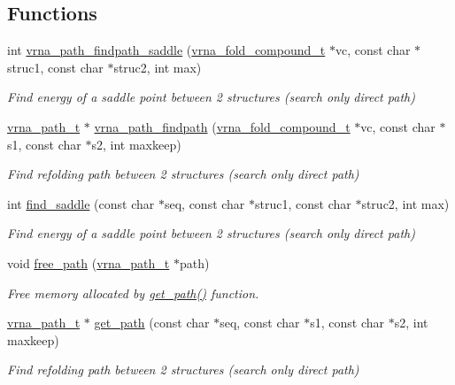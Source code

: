 \subsection*{Functions}
\begin{DoxyCompactItemize}
\item 
int \hyperlink{group__direct__paths_ga957922acc1bcaa97f52cbd0975f7dcd0}{vrna\-\_\-path\-\_\-findpath\-\_\-saddle} (\hyperlink{group__fold__compound_ga1b0cef17fd40466cef5968eaeeff6166}{vrna\-\_\-fold\-\_\-compound\-\_\-t} $\ast$vc, const char $\ast$struc1, const char $\ast$struc2, int max)
\begin{DoxyCompactList}\small\item\em Find energy of a saddle point between 2 structures (search only direct path) \end{DoxyCompactList}\item 
\hyperlink{group__direct__paths_ga818d4f3d1cf8723d6905990b08d909fe}{vrna\-\_\-path\-\_\-t} $\ast$ \hyperlink{group__direct__paths_ga5e1f97f58adc65016a8df88802dc16b5}{vrna\-\_\-path\-\_\-findpath} (\hyperlink{group__fold__compound_ga1b0cef17fd40466cef5968eaeeff6166}{vrna\-\_\-fold\-\_\-compound\-\_\-t} $\ast$vc, const char $\ast$s1, const char $\ast$s2, int maxkeep)
\begin{DoxyCompactList}\small\item\em Find refolding path between 2 structures (search only direct path) \end{DoxyCompactList}\item 
int \hyperlink{group__direct__paths_gad0e14268e309af773ecd1fce6244ee50}{find\-\_\-saddle} (const char $\ast$seq, const char $\ast$struc1, const char $\ast$struc2, int max)
\begin{DoxyCompactList}\small\item\em Find energy of a saddle point between 2 structures (search only direct path) \end{DoxyCompactList}\item 
void \hyperlink{group__direct__paths_ga9056421d716ae89f0ed3f107627f395b}{free\-\_\-path} (\hyperlink{group__direct__paths_ga818d4f3d1cf8723d6905990b08d909fe}{vrna\-\_\-path\-\_\-t} $\ast$path)
\begin{DoxyCompactList}\small\item\em Free memory allocated by \hyperlink{group__direct__paths_ga0b22426253e190bd268f86b01b71220d}{get\-\_\-path()} function. \end{DoxyCompactList}\item 
\hyperlink{group__direct__paths_ga818d4f3d1cf8723d6905990b08d909fe}{vrna\-\_\-path\-\_\-t} $\ast$ \hyperlink{group__direct__paths_ga0b22426253e190bd268f86b01b71220d}{get\-\_\-path} (const char $\ast$seq, const char $\ast$s1, const char $\ast$s2, int maxkeep)
\begin{DoxyCompactList}\small\item\em Find refolding path between 2 structures (search only direct path) \end{DoxyCompactList}\end{DoxyCompactItemize}


